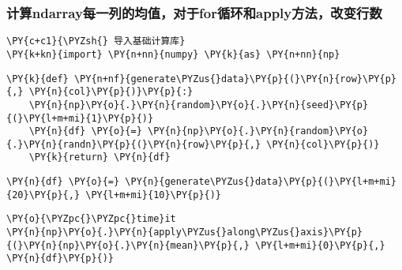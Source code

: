     \hypertarget{ux8ba1ux7b97ndarrayux6bcfux4e00ux5217ux7684ux5747ux503cux5bf9ux4e8eforux5faaux73afux548capplyux65b9ux6cd5ux6539ux53d8ux884cux6570}{%
\subsubsection{计算ndarray每一列的均值，对于for循环和apply方法，改变行数}\label{ux8ba1ux7b97ndarrayux6bcfux4e00ux5217ux7684ux5747ux503cux5bf9ux4e8eforux5faaux73afux548capplyux65b9ux6cd5ux6539ux53d8ux884cux6570}}

    \begin{tcolorbox}[breakable, size=fbox, boxrule=1pt, pad at break*=1mm,colback=cellbackground, colframe=cellborder]
\begin{Verbatim}[commandchars=\\\{\}]
\PY{c+c1}{\PYZsh{} 导入基础计算库}
\PY{k+kn}{import} \PY{n+nn}{numpy} \PY{k}{as} \PY{n+nn}{np}
\end{Verbatim}
\end{tcolorbox}

    \begin{tcolorbox}[breakable, size=fbox, boxrule=1pt, pad at break*=1mm,colback=cellbackground, colframe=cellborder]
\begin{Verbatim}[commandchars=\\\{\}]
\PY{k}{def} \PY{n+nf}{generate\PYZus{}data}\PY{p}{(}\PY{n}{row}\PY{p}{,} \PY{n}{col}\PY{p}{)}\PY{p}{:}
    \PY{n}{np}\PY{o}{.}\PY{n}{random}\PY{o}{.}\PY{n}{seed}\PY{p}{(}\PY{l+m+mi}{1}\PY{p}{)}
    \PY{n}{df} \PY{o}{=} \PY{n}{np}\PY{o}{.}\PY{n}{random}\PY{o}{.}\PY{n}{randn}\PY{p}{(}\PY{n}{row}\PY{p}{,} \PY{n}{col}\PY{p}{)}
    \PY{k}{return} \PY{n}{df}
\end{Verbatim}
\end{tcolorbox}

    \begin{tcolorbox}[breakable, size=fbox, boxrule=1pt, pad at break*=1mm,colback=cellbackground, colframe=cellborder]
\begin{Verbatim}[commandchars=\\\{\}]
\PY{n}{df} \PY{o}{=} \PY{n}{generate\PYZus{}data}\PY{p}{(}\PY{l+m+mi}{20}\PY{p}{,} \PY{l+m+mi}{10}\PY{p}{)}
\end{Verbatim}
\end{tcolorbox}

    \begin{tcolorbox}[breakable, size=fbox, boxrule=1pt, pad at break*=1mm,colback=cellbackground, colframe=cellborder]
\begin{Verbatim}[commandchars=\\\{\}]
\PY{o}{\PYZpc{}\PYZpc{}time}it
\PY{n}{np}\PY{o}{.}\PY{n}{apply\PYZus{}along\PYZus{}axis}\PY{p}{(}\PY{n}{np}\PY{o}{.}\PY{n}{mean}\PY{p}{,} \PY{l+m+mi}{0}\PY{p}{,} \PY{n}{df}\PY{p}{)}
\end{Verbatim}
\end{tcolorbox}

